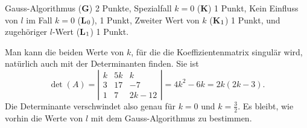 \begin{bewertung}
Gauss-Algorithmus ({\bf G}) 2 Punkte,
Spezialfall $k=0$ ({\bf K}) 1 Punkt,
Kein Einfluss von $l$ im Fall $k=0$ ({\bf L}$\mathstrut_0$), 1 Punkt,
Zweiter Wert von $k$ ({\bf K}$\mathstrut_1$) 1 Punkt,
und zugehöriger $l$-Wert ({\bf L}$\mathstrut_1$) 1 Punkt.
\end{bewertung}

\begin{diskussion}
Man kann die beiden Werte von $k$, für die die Koeffizientenmatrix
singulär wird, natürlich auch mit der Determinanten finden.
Sie ist
\[
\det(A)
=
\left|
\begin{matrix}
 k& 5k&    k  \\
 3& 17&   -7  \\
 1&  7& 2k -12
\end{matrix}
\right|
=
4k^2-6k = 2k(2k-3).
\]
Die Determinante verschwindet also genau für $k=0$ und $k=\frac32$.
Es bleibt, wie vorhin die Werte von $l$ mit dem Gauss-Algorithmus zu
bestimmen.
\end{diskussion}
